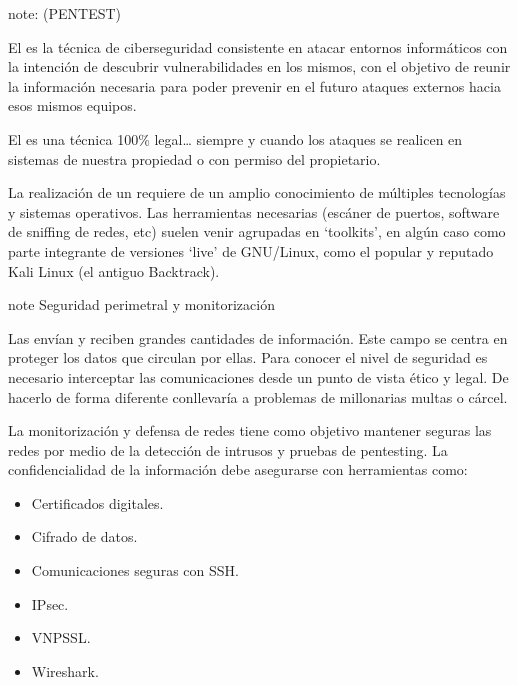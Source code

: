 \documentclass[letterpaper,10pt,spanish]{sphinxmanual}
\begin{document}
\begin{sphinxadmonition}{note}{: (PENTEST)}

\sphinxAtStartPar
El  es la técnica de ciberseguridad consistente en atacar entornos informáticos con la intención de descubrir vulnerabilidades en los mismos, con el objetivo de reunir la información necesaria para poder prevenir en el futuro ataques externos hacia esos mismos equipos.

\sphinxAtStartPar
El  es una técnica 100\% legal… siempre y cuando los ataques se realicen en sistemas de nuestra propiedad o con permiso del propietario.

\sphinxAtStartPar
La realización de un  requiere de un amplio conocimiento de múltiples tecnologías y sistemas operativos. Las herramientas necesarias (escáner de puertos, software de sniffing de redes, etc) suelen venir agrupadas en ‘toolkits’, en algún caso como parte integrante de versiones ‘live’ de GNU/Linux, como el popular y reputado Kali Linux (el antiguo Backtrack).
\end{sphinxadmonition}

\begin{sphinxadmonition}{note}{ Seguridad perimetral y monitorización}

\sphinxAtStartPar
Las  envían y reciben grandes cantidades de información. Este campo se centra en proteger los datos que circulan por ellas. Para conocer el nivel de seguridad es necesario interceptar las comunicaciones desde un punto de vista ético y legal. De hacerlo de forma diferente conllevaría a problemas de millonarias multas o cárcel.

\sphinxAtStartPar
La monitorización y defensa de redes tiene como objetivo mantener seguras las redes por medio de la detección de intrusos y pruebas de pentesting. La confidencialidad de la información debe asegurarse con herramientas como:
\begin{itemize}
\item {} 
\sphinxAtStartPar
Certificados digitales.

\item {} 
\sphinxAtStartPar
Cifrado de datos.

\item {} 
\sphinxAtStartPar
Comunicaciones seguras con SSH.

\item {} 
\sphinxAtStartPar
IPsec.

\item {} 
\sphinxAtStartPar
VNP\sphinxhyphen{}SSL.

\item {} 
\sphinxAtStartPar
Wireshark.

\end{itemize}
\end{sphinxadmonition}
\end{document}
